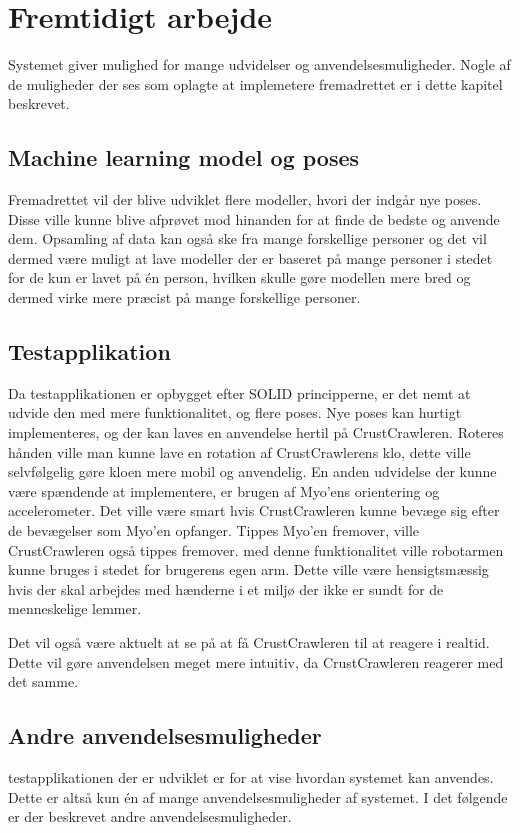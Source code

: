 \thispagestyle{fancy}
\chapter{Fremtidigt arbejde}
\label{chp:fremtidigtarbejde}
Systemet giver mulighed for mange udvidelser og anvendelsesmuligheder. Nogle af de muligheder der ses som oplagte at implemetere fremadrettet er i dette kapitel beskrevet.

\section{Machine learning model og poses}
Fremadrettet vil der blive udviklet flere modeller, hvori der indgår nye poses. Disse ville kunne blive afprøvet mod hinanden for at finde de bedste og anvende dem. Opsamling af data kan også ske fra mange forskellige personer og det vil dermed være muligt at lave modeller der er baseret på mange personer i stedet for de kun er lavet på én person, hvilken skulle gøre modellen mere bred og dermed virke mere præcist på mange forskellige personer.

\section{Testapplikation}
Da testapplikationen er opbygget efter SOLID principperne\citep{RefWorks:10}, er det nemt at udvide den med mere funktionalitet, og flere poses. Nye poses kan hurtigt implementeres, og der kan laves en anvendelse hertil på CrustCrawleren. Roteres hånden ville man kunne lave en rotation af CrustCrawlerens klo, dette ville selvfølgelig gøre kloen mere mobil og anvendelig. En anden udvidelse der kunne være spændende at implementere, er brugen af Myo'ens orientering og accelerometer. Det ville være smart hvis CrustCrawleren kunne bevæge sig efter de bevægelser som Myo'en opfanger. Tippes Myo'en fremover, ville CrustCrawleren også tippes fremover. med denne funktionalitet ville robotarmen kunne bruges i stedet for brugerens egen arm. Dette ville være hensigtsmæssig hvis der skal arbejdes med hænderne i et miljø der ikke er sundt for de menneskelige lemmer.

Det vil også være aktuelt at se på at få CrustCrawleren til at reagere i realtid. Dette vil gøre anvendelsen meget mere intuitiv, da CrustCrawleren reagerer med det samme.

\section{Andre anvendelsesmuligheder}
testapplikationen der er udviklet er for at vise hvordan systemet kan anvendes. Dette er altså kun én af mange anvendelsesmuligheder af systemet. I det følgende er der beskrevet andre anvendelsesmuligheder.

